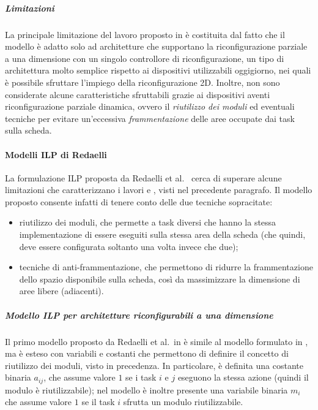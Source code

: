 \subparagraph{Limitazioni}
La principale limitazione del lavoro proposto in 
\cite{BanerjeePhysicalConstraints} è costituita dal fatto che il modello è 
adatto solo ad architetture che supportano la riconfigurazione parziale a una 
dimensione con un singolo controllore di riconfigurazione, un tipo di 
architettura molto semplice rispetto ai dispositivi utilizzabili oggigiorno,
nei quali è possibile sfruttare l'impiego della riconfigurazione 2D. 
Inoltre, non sono considerate alcune caratteristiche sfruttabili grazie ai 
dispositivi aventi riconfigurazione parziale dinamica, ovvero il \emph{riutilizzo 
dei moduli} ed eventuali tecniche per evitare un'eccessiva \emph{frammentazione} 
delle aree occupate dai task sulla scheda.


\paragraph{Modelli \acs{ILP} di Redaelli} %
La formulazione \ac{ILP} proposta da Redaelli et al.~\cite{Redaelli1DILP} cerca 
di superare alcune limitazioni che caratterizzano i lavori 
\cite{BanerjeeHwSwPartitioning} e \cite{BanerjeePhysicalConstraints}, visti nel 
precedente paragrafo. %
Il modello proposto consente infatti di tenere conto delle due tecniche 
sopracitate:
\begin{itemize}
 \item riutilizzo dei moduli, che permette a task diversi che hanno la stessa 
implementazione di essere eseguiti sulla stessa area della scheda (che quindi, 
deve essere configurata soltanto una volta invece che due);
 \item tecniche di anti-frammentazione, che permettono di ridurre la 
frammentazione dello spazio disponibile sulla scheda, così da massimizzare la 
dimensione di aree libere (adiacenti).
\end{itemize}

\subparagraph{Modello \acs{ILP} per architetture riconfigurabili a una 
dimensione}
Il primo modello proposto da Redaelli et al.~in \cite{Redaelli1DILP} è simile 
al modello formulato in \cite{BanerjeePhysicalConstraints}, ma è esteso con 
variabili e costanti che permettono di definire il concetto di riutilizzo dei 
moduli, visto in precedenza. In particolare, è definita una costante 
binaria $a_{ij}$, che assume valore $1$ se i task $i$ e $j$ eseguono la stessa 
azione (quindi il modulo è riutilizzabile); nel modello è inoltre presente una 
variabile binaria $m_i$ che assume valore $1$ se il task $i$ sfrutta un modulo 
riutilizzabile.

